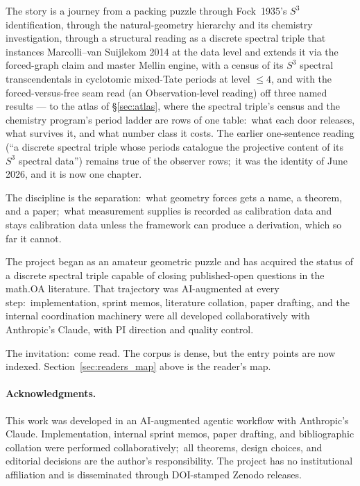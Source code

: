\documentclass[11pt,a4paper]{article}
\newcommand{\sthree}{S^{3}}
\begin{document}
The story is a journey from a packing puzzle through Fock~1935's
$\sthree$ identification, through the natural-geometry hierarchy and
its chemistry investigation, through a structural reading as a discrete
spectral triple that instances Marcolli--van Suijlekom 2014 at the
data level and extends it via the forced-graph claim and master
Mellin engine, with
a census of its $\sthree$ spectral transcendentals in cyclotomic
mixed-Tate periods at level $\le 4$, and with the forced-versus-free
seam read (an Observation-level reading) off three named results --- to
the atlas of \S\ref{sec:atlas}, where the spectral triple's census and
the chemistry program's period ladder are rows of one table:\ what each
door releases, what survives it, and what number class it costs.  The
earlier one-sentence reading (``a discrete spectral triple whose periods
catalogue the projective content of its $\sthree$ spectral data'')
remains true of the observer rows;\ it was the identity of June 2026,
and it is now one chapter.

The discipline is the separation:\ what geometry forces gets a name,
a theorem, and a paper;\ what measurement supplies is recorded as
calibration data and stays calibration data unless the framework can
produce a derivation, which so far it cannot.

The project began as an amateur geometric puzzle and has acquired the
status of a discrete spectral triple capable of closing
published-open questions in the math.OA literature.  That trajectory
was AI-augmented at every step:\ implementation, sprint memos,
literature collation, paper drafting, and the internal coordination
machinery were all developed collaboratively with Anthropic's Claude,
with PI direction and quality control.

The invitation:\ come read.  The corpus is dense, but the entry points
are now indexed.  Section~\ref{sec:readers_map} above is the
reader's map.

\paragraph*{Acknowledgments.}
This work was developed in an AI-augmented agentic workflow with
Anthropic's Claude.  Implementation, internal sprint memos, paper
drafting, and bibliographic collation were performed collaboratively;\
all theorems, design choices, and editorial decisions are the
author's responsibility.  The project has no institutional affiliation
and is disseminated through DOI-stamped Zenodo releases.
\end{document}
